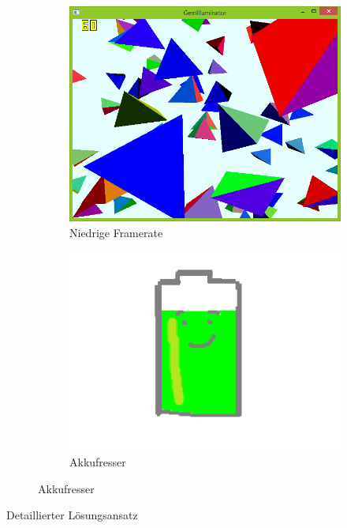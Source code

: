 {
	\begin{figure}
		\centering
		\begin{subfigure}{\textwidth}
			\centering
			\includegraphics[width=\textwidth, height=0.3\textheight, keepaspectratio]{images/highFPS}
			\caption{Niedrige Framerate}
		\end{subfigure}
		\begin{subfigure}{\textwidth}
			\centering
			\includegraphics[width=\textwidth, height=0.3\textheight, keepaspectratio]{images/akkufresser2}
			\caption{Akkufresser}
		\end{subfigure}
	\end{figure}
}


\begin{frame}{Detaillierter Lösungsansatz}

\end{frame}



